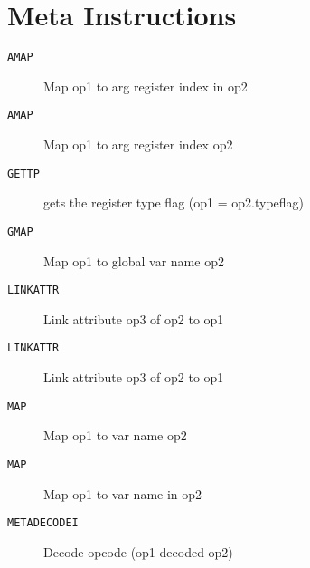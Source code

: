 \section{Meta Instructions}
\begin{description}
\item[\texttt{AMAP       }]  Map op1 to arg register index in op2\\
\end{description}

\begin{description}
\item[\texttt{AMAP       }]  Map op1 to arg register index  op2\\
\end{description}

\begin{description}
\item[\texttt{GETTP      }]  gets the register type flag (op1 = op2.typeflag)\\
\end{description}

\begin{description}
\item[\texttt{GMAP       }]  Map op1 to global var name op2\\
\end{description}

\begin{description}
\item[\texttt{LINKATTR   }]  Link attribute op3 of op2 to op1\\
\end{description}

\begin{description}
\item[\texttt{LINKATTR   }]  Link attribute op3 of op2 to op1\\
\end{description}

\begin{description}
\item[\texttt{MAP        }]  Map op1 to var name op2\\
\end{description}

\begin{description}
\item[\texttt{MAP        }]  Map op1 to var name in op2\\
\end{description}

\begin{description}
\item[\texttt{METADECODEI}]      Decode opcode (op1 decoded op2)\\
\end{description}
